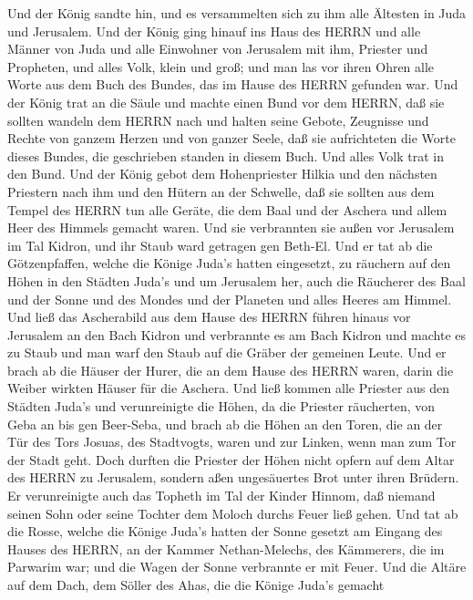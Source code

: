  Und der König sandte hin, und es versammelten sich zu ihm
alle Ältesten in Juda und Jerusalem.  Und der König ging
hinauf ins Haus des HERRN und alle Männer von Juda und alle Einwohner
von Jerusalem mit ihm, Priester und Propheten, und alles Volk, klein und
groß; und man las vor ihren Ohren alle Worte aus dem Buch des Bundes,
das im Hause des HERRN gefunden war.  Und der König trat an
die Säule und machte einen Bund vor dem HERRN, daß sie sollten wandeln
dem HERRN nach und halten seine Gebote, Zeugnisse und Rechte von ganzem
Herzen und von ganzer Seele, daß sie aufrichteten die Worte dieses
Bundes, die geschrieben standen in diesem Buch. Und alles Volk trat in
den Bund.  Und der König gebot dem Hohenpriester Hilkia und
den nächsten Priestern nach ihm und den Hütern an der Schwelle, daß sie
sollten aus dem Tempel des HERRN tun alle Geräte, die dem Baal und der
Aschera und allem Heer des Himmels gemacht waren. Und sie verbrannten
sie außen vor Jerusalem im Tal Kidron, und ihr Staub ward getragen gen
Beth-El.  Und er tat ab die Götzenpfaffen, welche die Könige
Juda's hatten eingesetzt, zu räuchern auf den Höhen in den Städten
Juda's und um Jerusalem her, auch die Räucherer des Baal und der Sonne
und des Mondes und der Planeten und alles Heeres am Himmel. 
Und ließ das Ascherabild aus dem Hause des HERRN führen hinaus vor
Jerusalem an den Bach Kidron und verbrannte es am Bach Kidron und machte
es zu Staub und man warf den Staub auf die Gräber der gemeinen Leute.
 Und er brach ab die Häuser der Hurer, die an dem Hause des
HERRN waren, darin die Weiber wirkten Häuser für die Aschera.
 Und ließ kommen alle Priester aus den Städten Juda's und
verunreinigte die Höhen, da die Priester räucherten, von Geba an bis gen
Beer-Seba, und brach ab die Höhen an den Toren, die an der Tür des Tors
Josuas, des Stadtvogts, waren und zur Linken, wenn man zum Tor der Stadt
geht.  Doch durften die Priester der Höhen nicht opfern auf
dem Altar des HERRN zu Jerusalem, sondern aßen ungesäuertes Brot unter
ihren Brüdern.  Er verunreinigte auch das Topheth im Tal
der Kinder Hinnom, daß niemand seinen Sohn oder seine Tochter dem Moloch
durchs Feuer ließ gehen.  Und tat ab die Rosse, welche die
Könige Juda's hatten der Sonne gesetzt am Eingang des Hauses des HERRN,
an der Kammer Nethan-Melechs, des Kämmerers, die im Parwarim war; und
die Wagen der Sonne verbrannte er mit Feuer.  Und die
Altäre auf dem Dach, dem Söller des Ahas, die die Könige Juda's gemacht

